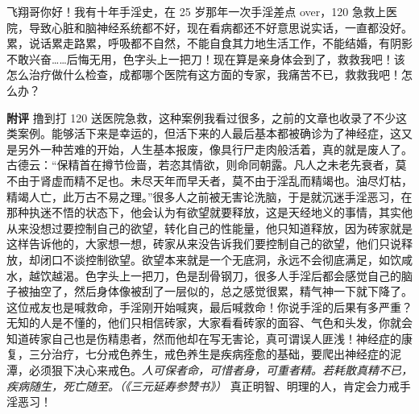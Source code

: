 \begin{case}
    飞翔哥你好！我有十年手淫史，在 25 岁那年一次手淫差点 over，120 急救上医院，导致心脏和脑神经系统都不好，现在看病都还不好意思说实话，一直都没好。累，说话累走路累，呼吸都不自然，不能自食其力地生活工作，不能结婚，有阴影不敢兴奋……后悔无用，色字头上一把刀！现在算是亲身体会到了，救救我吧！该怎么治疗做什么检查，成都哪个医院有这方面的专家，我痛苦不已，救救我吧！怎么办？

    \textbf{附评} 撸到打 120 送医院急救，这种案例我看过很多，之前的文章也收录了不少这类案例。能够活下来是幸运的，但活下来的人最后基本都被确诊为了神经症，这又是另外一种苦难的开始，人生基本报废，像具行尸走肉般活着，真的就是废人了。古德云：“保精首在撙节俭啬，若恣其情欲，则命同朝露。凡人之未老先衰者，莫不由于肾虚而精不足也。未尽天年而早夭者，莫不由于淫乱而精竭也。油尽灯枯，精竭人亡，此万古不易之理。”很多人之前被无害论洗脑，于是就沉迷手淫恶习，在那种执迷不悟的状态下，他会认为有欲望就要释放，这是天经地义的事情，其实他从来没想过要控制自己的欲望，转化自己的性能量，他只知道释放，因为砖家就是这样告诉他的，大家想一想，砖家从来没告诉我们要控制自己的欲望，他们只说释放，却闭口不谈控制欲望。欲望本来就是一个无底洞，永远不会彻底满足，如饮咸水，越饮越渴。色字头上一把刀，色是刮骨钢刀，很多人手淫后都会感觉自己的脑子被抽空了，然后身体像被刮了一层似的，总之感觉很累，精气神一下就下降了。这位戒友也是喊救命，手淫刚开始喊爽，最后喊救命！你说手淫的后果有多严重？无知的人是不懂的，他们只相信砖家，大家看看砖家的面容、气色和头发，你就会知道砖家自己也是伤精患者，然而他却在写无害论，真可谓误人匪浅！神经症的康复，三分治疗，七分戒色养生，戒色养生是疾病痊愈的基础，要爬出神经症的泥潭，必须狠下决心来戒色。\textit{人可保者命，可惜者身，可重者精。若耗散真精不已，疾病随生，死亡随至。（《三元延寿参赞书》）} 真正明智、明理的人，肯定会力戒手淫恶习！
\end{case}

